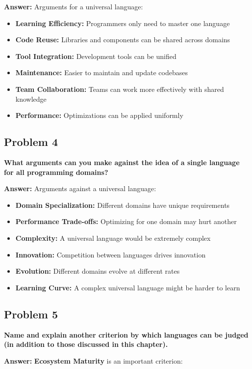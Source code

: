 \documentclass[11pt,a4paper]{article}
\begin{document}
\textbf{Answer:}
Arguments for a universal language:

\begin{itemize}
\item \textbf{Learning Efficiency:} Programmers only need to master one language
\item \textbf{Code Reuse:} Libraries and components can be shared across domains
\item \textbf{Tool Integration:} Development tools can be unified
\item \textbf{Maintenance:} Easier to maintain and update codebases
\item \textbf{Team Collaboration:} Teams can work more effectively with shared knowledge
\item \textbf{Performance:} Optimizations can be applied uniformly
\end{itemize}

\subsection{Problem 4}
\textbf{What arguments can you make against the idea of a single language for all programming domains?}

\textbf{Answer:}
Arguments against a universal language:

\begin{itemize}
\item \textbf{Domain Specialization:} Different domains have unique requirements
\item \textbf{Performance Trade-offs:} Optimizing for one domain may hurt another
\item \textbf{Complexity:} A universal language would be extremely complex
\item \textbf{Innovation:} Competition between languages drives innovation
\item \textbf{Evolution:} Different domains evolve at different rates
\item \textbf{Learning Curve:} A complex universal language might be harder to learn
\end{itemize}

\subsection{Problem 5}
\textbf{Name and explain another criterion by which languages can be judged (in addition to those discussed in this chapter).}

\textbf{Answer:}
\textbf{Ecosystem Maturity} is an important criterion:
\end{document}
